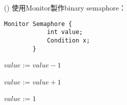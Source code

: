 \begin{theorem}{()} 使用Monitor製作binary semaphore：
    \begin{lstlisting}[caption={Data structure (Making semaphore using monitor).}, captionpos=b, mathescape=true]
        Monitor Semaphore {
            int value;
            Condition x;
        }
    \end{lstlisting}
    \begin{algorithm}[H]
        \caption{$Wait()$.}
        \begin{algorithmic}[1]
                    \State {}
                \EndIf
                \State $value$ := $value - 1$
            \EndFunction
        \end{algorithmic}
    \end{algorithm}
    \begin{algorithm}[H]
        \caption{$Signal()$.}
        \begin{algorithmic}[1]
                \State $value$ := $value + 1$
                \State {}
            \EndFunction
        \end{algorithmic}
    \end{algorithm}
    \begin{algorithm}[H]
        \caption{$initialization\_code()$.}
        \begin{algorithmic}[1]
                \State $value$ := $1$
            \EndFunction
        \end{algorithmic}
    \end{algorithm}
\end{theorem}

